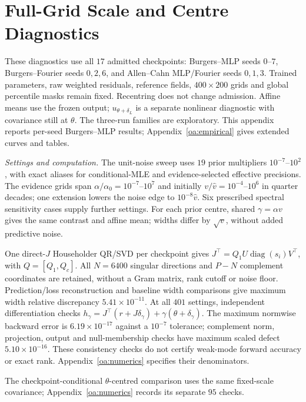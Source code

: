 \section{Full-Grid Scale and Centre Diagnostics}\label{app:r2}

These diagnostics use all $17$ admitted checkpoints: Burgers--MLP seeds $0$--$7$,
Burgers--Fourier seeds $0,2,6$, and Allen--Cahn MLP/Fourier seeds $0,1,3$.
Trained parameters, raw weighted residuals, reference fields, $400\times200$ grids and
global percentile masks remain fixed. Recentring does not change admission. Affine means
use the frozen output; $u_{\theta+\delta_L}$ is a separate nonlinear diagnostic with
covariance still at $\theta$. The three-run families are exploratory. This appendix reports per-seed
Burgers--MLP results; Appendix~\ref{oa:empirical} gives extended curves and tables.



\emph{Settings and computation.}\label{app:r2:numerics}
The unit-noise sweep uses $19$ prior multipliers $10^{-7}$--$10^2$, with exact aliases
for conditional-MLE and evidence-selected effective precisions. The evidence grids
span $\alpha/\alpha_0=10^{-7}$--$10^7$ and initially
$v/\widehat v=10^{-4}$--$10^6$ in quarter decades; one extension lowers the noise edge
to $10^{-8}\widehat v$. Six prescribed spectral sensitivity cases supply further
settings. For each prior centre, shared $\gamma=\alpha v$ gives the same contrast and affine mean;
widths differ by $\sqrt v$, without added predictive noise.

One direct-$J$ Householder QR/SVD per checkpoint gives
$J^\top=Q_1U\operatorname{diag}(s_i)V^\top$, with $Q=[Q_1,Q_c]$.
All $N=6400$ singular directions and $P-N$ complement coordinates are retained,
without a Gram matrix, rank cutoff or noise floor. Prediction/loss reconstruction and
baseline width comparisons give maximum width relative discrepancy
$5.41\times10^{-11}$. At all $401$ settings, independent differentiation checks
$h_\gamma=J^\top(r+J\delta_\gamma)+\gamma(\theta+\delta_\gamma)$.
The maximum normwise backward error is $6.19\times10^{-17}$ against a $10^{-7}$
tolerance; complement norm, projection, output and null-membership checks have maximum
scaled defect $5.10\times10^{-16}$. These consistency checks do not certify weak-mode
forward accuracy or exact rank. Appendix~\ref{oa:numerics} specifies their denominators.

The checkpoint-conditional $\theta$-centred comparison uses the same fixed-scale
covariance; Appendix~\ref{oa:numerics} records its separate $95$ checks.

